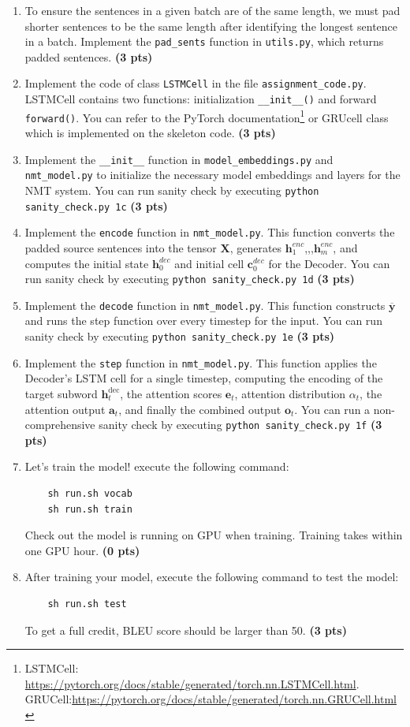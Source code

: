 \documentclass{assignment format}
\newcommand{\hdec}{\mathbf{h}^{\text{dec}}}
\begin{document}
\begin{enumerate}[label=(\alph*)]

    \item To ensure the sentences in a given batch are of the same length, we must pad shorter sentences to be the same length after identifying the longest sentence in a batch. Implement the \texttt{pad\_sents} function in \texttt{utils.py}, which returns padded sentences. \textbf{(3 pts)}
    \item Implement the code of class \texttt{LSTMCell} in the file \texttt{assignment\_code.py}. LSTMCell contains two functions: initialization \texttt{\_\_init\_\_()} and forward \texttt{forward()}. You can refer to the PyTorch documentation\footnote{LSTMCell: \url{https://pytorch.org/docs/stable/generated/torch.nn.LSTMCell.html}. GRUCell:\url{https://pytorch.org/docs/stable/generated/torch.nn.GRUCell.html}} or GRUcell class which is implemented on the skeleton code.  \textbf{(3 pts)}
   \item Implement the \texttt{\_\_init\_\_} function in \texttt{model\_embeddings.py} and \texttt{nmt\_model.py} to initialize the necessary model embeddings and layers for the NMT system. You can run sanity check by executing \texttt{python sanity\_check.py 1c} \textbf{(3 pts)}
   
    \item Implement the \texttt{encode} function in \texttt{nmt\_model.py}. This function converts the padded source sentences into the tensor $\mathbf{X}$, generates $\mathbf{h}^{enc}_1$,,,$\mathbf{h}^{enc}_m$, and computes the initial state $\mathbf{h}^{dec}_0$ and initial cell $\mathbf{c}^{dec}_0$ for the Decoder. You can run sanity check by executing \texttt{python sanity\_check.py 1d} \textbf{(3 pts)}
    \item Implement the \texttt{decode} function in \texttt{nmt\_model.py}. This function constructs $\overline{\mathbf{y}}$ 
    and runs the step function over every timestep for the input. You can run sanity check by executing \texttt{python sanity\_check.py 1e} \textbf{(3 pts)}
    \item Implement the \texttt{step} function in \texttt{nmt\_model.py}. This function applies the Decoder's LSTM cell for a single timestep, computing the encoding of the target subword $\hdec_t$, the attention scores $\mathbf{e}_t$, attention distribution $\alpha_t$, the attention output $\mathbf{a}_{t}$, and finally the combined output $\mathbf{o}_t$. You can run a non-comprehensive sanity check by executing \texttt{python sanity\_check.py 1f}  \textbf{(3 pts)}
\item Let's train the model! execute the following command:
\begin{verbatim}
    sh run.sh vocab
    sh run.sh train
\end{verbatim}
Check out the model is running on GPU when training. Training takes within one GPU hour. \textbf{(0 pts)}
    \item After training your model, execute the following command to test the model:
\begin{verbatim}
    sh run.sh test
\end{verbatim}
    To get a full credit, BLEU score should be larger than 50. \textbf{(3 pts)}
    

\end{enumerate}
\end{document}
